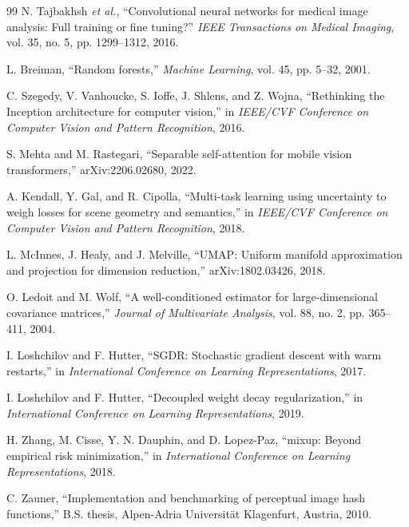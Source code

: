 \documentclass[conference,twoside]{IEEEtran}
\begin{document}
\begin{thebibliography}{99}
N. Tajbakhsh \textit{et al.}, ``Convolutional neural networks for medical image analysis: Full training or fine tuning?'' \emph{IEEE Transactions on Medical Imaging}, vol. 35, no. 5, pp. 1299--1312, 2016.

L. Breiman, ``Random forests,'' \emph{Machine Learning}, vol. 45, pp. 5--32, 2001.

C. Szegedy, V. Vanhoucke, S. Ioffe, J. Shlens, and Z. Wojna, ``Rethinking the Inception architecture for computer vision,'' in \emph{IEEE/CVF Conference on Computer Vision and Pattern Recognition}, 2016.

S. Mehta and M. Rastegari, ``Separable self-attention for mobile vision transformers,'' arXiv:2206.02680, 2022.

A. Kendall, Y. Gal, and R. Cipolla, ``Multi-task learning using uncertainty to weigh losses for scene geometry and semantics,'' in \emph{IEEE/CVF Conference on Computer Vision and Pattern Recognition}, 2018.

L. McInnes, J. Healy, and J. Melville, ``UMAP: Uniform manifold approximation and projection for dimension reduction,'' arXiv:1802.03426, 2018.

O. Ledoit and M. Wolf, ``A well-conditioned estimator for large-dimensional covariance matrices,'' \emph{Journal of Multivariate Analysis}, vol. 88, no. 2, pp. 365--411, 2004.

I. Loshchilov and F. Hutter, ``SGDR: Stochastic gradient descent with warm restarts,'' in \emph{International Conference on Learning Representations}, 2017.

I. Loshchilov and F. Hutter, ``Decoupled weight decay regularization,'' in \emph{International Conference on Learning Representations}, 2019.

H. Zhang, M. Cisse, Y. N. Dauphin, and D. Lopez-Paz, ``mixup: Beyond empirical risk minimization,'' in \emph{International Conference on Learning Representations}, 2018.

C. Zauner, ``Implementation and benchmarking of perceptual image hash functions,'' B.S. thesis, Alpen-Adria Universit\"{a}t Klagenfurt, Austria, 2010.

\end{thebibliography}
\end{document}
